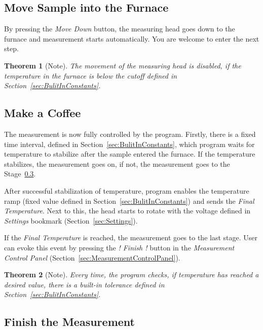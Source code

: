 \documentclass[a4paper,11pt,twoside]{book}
\theoremstyle{named}
\newtheorem*{namedtheorem}{Theorem}
\begin{document}
\subsection{Move Sample into the Furnace}

By pressing the \textit{Move Down} button, the measuring head goes down to the
furnace and measurement starts automatically. You are welcome to enter the next
step. 

\begin{namedtheorem}[Note]
  The movement of the measuring head is disabled, if the temperature in the
  furnace is below the cutoff defined in Section~\ref{sec:BulitInConstants}.
\end{namedtheorem}

\subsection{Make a Coffee}

The measurement is now fully controlled by the program. Firstly, there is a fixed time
interval, defined in Section~\ref{sec:BulitInConstants}, which program waits for
temperature to stabilize after the sample entered the furnace. If the temperature
stabilizes, the measurement goes on, if not, the measurement goes to the
Stage~\ref{sec:FinishTheMeasurement}.

After successful stabilization of temperature, program enables the temperature
ramp (fixed value defined in Section~\ref{sec:BulitInConstants}) and sends the
\textit{Final Temperature}. Next to this, the head starts to rotate with the
voltage defined in \textit{Settings} bookmark (Section~\ref{sec:Settings}).

If the \textit{Final Temperature} is reached, the measurement goes to the last
stage. User can evoke this event by pressing the \textit{! Finish !} button in
the \textit{Measurement Control Panel}
(Section~\ref{sec:MeasurementControlPanel}).

\begin{namedtheorem}[Note]
  Every time, the program checks, if temperature has reached a desired value,
  there is a built-in tolerance defined in Section~\ref{sec:BulitInConstants}.
\end{namedtheorem}

\subsection{Finish the Measurement}
\label{sec:FinishTheMeasurement}
\end{document}
